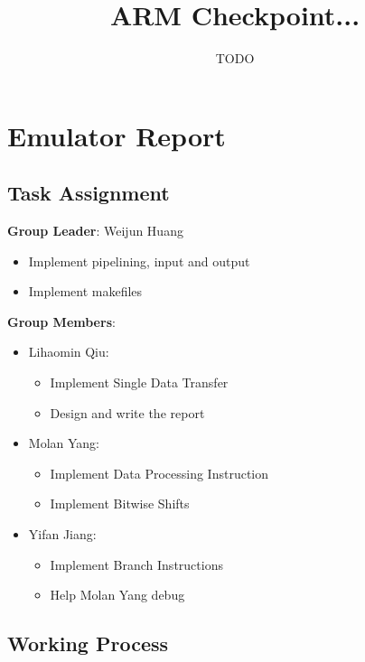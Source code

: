 \documentclass[11pt]{article}
\begin{document}
\title{ARM Checkpoint... }
\author{TODO}

\maketitle

\section*{Emulator Report}

\subsection*{Task Assignment}

\textbf{Group Leader}: Weijun Huang

\begin{itemize}
  \item Implement pipelining, input and output
  \item Implement makefiles
\end{itemize}

\textbf{Group Members}:

\begin{itemize}
  \item Lihaomin Qiu:
    \begin{itemize}
      \item Implement Single Data Transfer
      \item Design and write the report
    \end{itemize}
  \item Molan Yang:
    \begin{itemize}
      \item Implement Data Processing Instruction
      \item Implement Bitwise Shifts
    \end{itemize}
  \item Yifan Jiang:
    \begin{itemize}
      \item Implement Branch Instructions
      \item Help Molan Yang debug
    \end{itemize}
\end{itemize}

\subsection*{Working Process}
\end{document}
